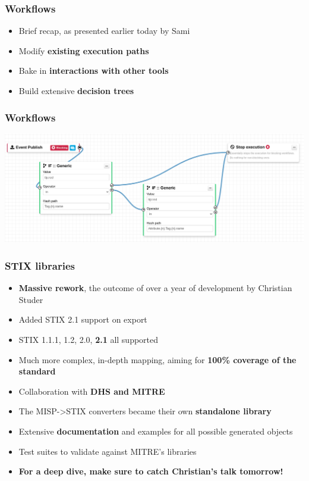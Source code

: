 \begin{frame}
  \frametitle{Workflows}
  \begin{itemize}
     \item Brief recap, as presented earlier today by Sami
     \item Modify {\bf existing execution paths}
     \item Bake in {\bf interactions with other tools}
     \item Build extensive {\bf decision trees}
  \end{itemize}
\end{frame}

\begin{frame}
\frametitle{Workflows}
\includegraphics[scale=0.25]{images/workflows.png}
\end{frame}

\begin{frame}
  \frametitle{STIX libraries}
  \begin{itemize}
     \item {\bf Massive rework}, the outcome of over a year of development by Christian Studer
     \item Added STIX 2.1 support on export
     \item STIX 1.1.1, 1.2, 2.0, {\bf 2.1} all supported
     \item Much more complex, in-depth mapping, aiming for {\bf 100\% coverage of the standard}
     \item Collaboration with {\bf DHS and MITRE}
     \item The MISP->STIX converters became their own {\bf standalone library}
     \item Extensive {\bf documentation} and examples for all possible generated objects
     \item Test suites to validate against MITRE's libraries
     \item {\bf For a deep dive, make sure to catch Christian's talk tomorrow!}
  \end{itemize}
\end{frame}

